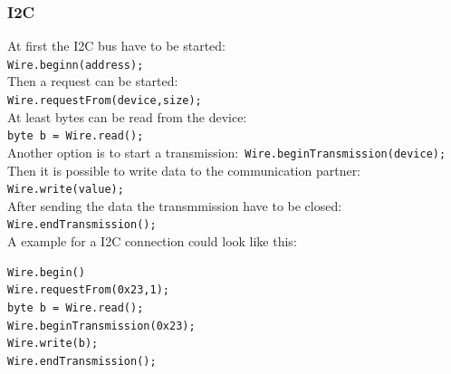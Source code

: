 \documentclass[english, 10pt]{report}
\begin{document}
\subsubsection{I2C}
At first the I2C bus have to be started: \\
\lstinline|Wire.beginn(address);| \\
Then a request can be started: \\
\lstinline|Wire.requestFrom(device,size);| \\
At least bytes can be read from the device: \\
\lstinline|byte b = Wire.read();| \\
Another option is to start a transmission:\
\lstinline|Wire.beginTransmission(device);| \\
Then it is possible to write data to the communication partner:\\
\lstinline|Wire.write(value);|\\
After sending the data the transmmission have to be closed:\\
\lstinline|Wire.endTransmission();|\\
A example for a I2C connection could look like this:\\
\begin{lstlisting}
Wire.begin()
Wire.requestFrom(0x23,1);
byte b = Wire.read();
Wire.beginTransmission(0x23);
Wire.write(b);
Wire.endTransmission();
\end{lstlisting}
\end{document}
